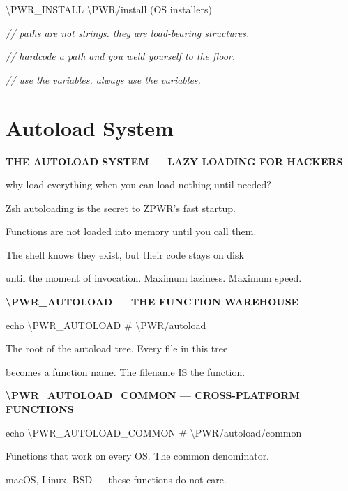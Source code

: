 \documentclass[11pt,a4paper,twoside]{book}
\begin{document}
\textbackslash{}PWR\_INSTALL        \textbackslash{}PWR/install (OS installers)

{\small\itshape\color{dimtext} // paths are not strings. they are load-bearing structures.}

{\small\itshape\color{dimtext} // hardcode a path and you weld yourself to the floor.}

{\small\itshape\color{dimtext} // use the variables. always use the variables.}


\vspace{16pt}

\section{Autoload System}


\vspace{10pt}
{\large\bfseries\color{neoncyan} THE AUTOLOAD SYSTEM — LAZY LOADING FOR HACKERS}\vspace{6pt}

why load everything when you can load nothing until needed?

Zsh autoloading is the secret to ZPWR's fast startup.

Functions are not loaded into memory until you call them.

The shell knows they exist, but their code stays on disk

until the moment of invocation. Maximum laziness. Maximum speed.


\vspace{12pt}
{\bfseries\color{neonyellow} \textbackslash{}PWR\_AUTOLOAD — THE FUNCTION WAREHOUSE}\vspace{4pt}

echo \textbackslash{}PWR\_AUTOLOAD   \# \textbackslash{}PWR/autoload

The root of the autoload tree. Every file in this tree

becomes a function name. The filename IS the function.


\vspace{12pt}
{\bfseries\color{neonyellow} \textbackslash{}PWR\_AUTOLOAD\_COMMON — CROSS-PLATFORM FUNCTIONS}\vspace{4pt}

echo \textbackslash{}PWR\_AUTOLOAD\_COMMON   \# \textbackslash{}PWR/autoload/common

Functions that work on every OS. The common denominator.

macOS, Linux, BSD — these functions do not care.
\end{document}
